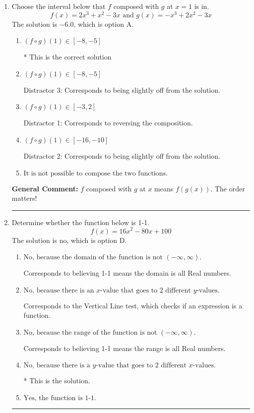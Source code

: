 \documentclass{extbook}[14pt]
\newcommand{\litem}[1]{\item #1

\rule{\textwidth}{0.4pt}}
\begin{document}
\begin{enumerate}\litem{
Choose the interval below that $f$ composed with $g$ at $x=1$ is in.
\[ f(x) = 2x^{3} + x^{2} -3 x \text{ and } g(x) = -x^{3} +2 x^{2} -3 x \]The solution is \( -6.0 \), which is option A.\begin{enumerate}[label=\Alph*.]
\item \( (f \circ g)(1) \in [-8, -5] \)

* This is the correct solution
\item \( (f \circ g)(1) \in [-8, -5] \)

 Distractor 3: Corresponds to being slightly off from the solution.
\item \( (f \circ g)(1) \in [-3, 2] \)

 Distractor 1: Corresponds to reversing the composition.
\item \( (f \circ g)(1) \in [-16, -10] \)

 Distractor 2: Corresponds to being slightly off from the solution.
\item \( \text{It is not possible to compose the two functions.} \)


\end{enumerate}

\textbf{General Comment:} $f$ composed with $g$ at $x$ means $f(g(x))$. The order matters!
}
\litem{
Determine whether the function below is 1-1.
\[ f(x) = 16 x^2 - 80 x + 100 \]The solution is \( \text{no} \), which is option D.\begin{enumerate}[label=\Alph*.]
\item \( \text{No, because the domain of the function is not $(-\infty, \infty)$.} \)

Corresponds to believing 1-1 means the domain is all Real numbers.
\item \( \text{No, because there is an $x$-value that goes to 2 different $y$-values.} \)

Corresponds to the Vertical Line test, which checks if an expression is a function.
\item \( \text{No, because the range of the function is not $(-\infty, \infty)$.} \)

Corresponds to believing 1-1 means the range is all Real numbers.
\item \( \text{No, because there is a $y$-value that goes to 2 different $x$-values.} \)

* This is the solution.
\item \( \text{Yes, the function is 1-1.} \)


\end{enumerate}}
\end{enumerate}
\end{document}
